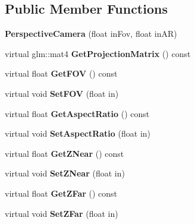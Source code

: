 \subsection*{Public Member Functions}
\begin{DoxyCompactItemize}
\item 
\hypertarget{class_perspective_camera_adb5624bfee18c9390df3ba0612431124}{}{\bfseries Perspective\+Camera} (float in\+Fov, float in\+A\+R)\label{class_perspective_camera_adb5624bfee18c9390df3ba0612431124}

\item 
\hypertarget{class_perspective_camera_a24a338c552cede73ae7d69527ec85817}{}virtual glm\+::mat4 {\bfseries Get\+Projection\+Matrix} () const \label{class_perspective_camera_a24a338c552cede73ae7d69527ec85817}

\item 
\hypertarget{class_perspective_camera_a47ca1c9615ef9cb9dbe3436e561b76a0}{}virtual float {\bfseries Get\+F\+O\+V} () const \label{class_perspective_camera_a47ca1c9615ef9cb9dbe3436e561b76a0}

\item 
\hypertarget{class_perspective_camera_a03f2ce1c0940599712b12a07719b5122}{}virtual void {\bfseries Set\+F\+O\+V} (float in)\label{class_perspective_camera_a03f2ce1c0940599712b12a07719b5122}

\item 
\hypertarget{class_perspective_camera_a02d3e3a9a8b3770ed0cad810a3946dee}{}virtual float {\bfseries Get\+Aspect\+Ratio} () const \label{class_perspective_camera_a02d3e3a9a8b3770ed0cad810a3946dee}

\item 
\hypertarget{class_perspective_camera_a2f8753cd16d119ed00d050b4dbac2510}{}virtual void {\bfseries Set\+Aspect\+Ratio} (float in)\label{class_perspective_camera_a2f8753cd16d119ed00d050b4dbac2510}

\item 
\hypertarget{class_perspective_camera_a42fbe0fea96a362cd6e5e7e6414843ac}{}virtual float {\bfseries Get\+Z\+Near} () const \label{class_perspective_camera_a42fbe0fea96a362cd6e5e7e6414843ac}

\item 
\hypertarget{class_perspective_camera_ab9bab141c767e0b604b213f482f72c8a}{}virtual void {\bfseries Set\+Z\+Near} (float in)\label{class_perspective_camera_ab9bab141c767e0b604b213f482f72c8a}

\item 
\hypertarget{class_perspective_camera_a7e954166961c8d643c24fec0aa0261a4}{}virtual float {\bfseries Get\+Z\+Far} () const \label{class_perspective_camera_a7e954166961c8d643c24fec0aa0261a4}

\item 
\hypertarget{class_perspective_camera_a4374ca73880370dad1b93eaf489c9bb4}{}virtual void {\bfseries Set\+Z\+Far} (float in)\label{class_perspective_camera_a4374ca73880370dad1b93eaf489c9bb4}

\end{DoxyCompactItemize}
